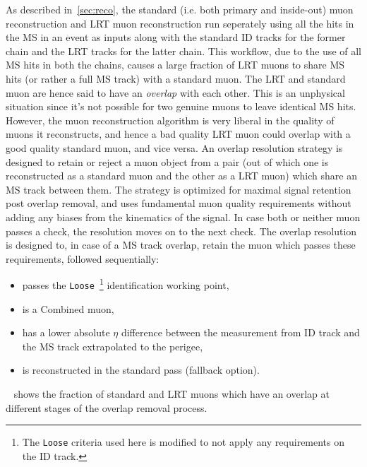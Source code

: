 As described in~\cref{sec:reco}, the standard (i.e. both primary and inside-out) muon reconstruction and LRT muon reconstruction run seperately using all the hits in the MS in an event as inputs along with the standard ID tracks for the former chain and the LRT tracks for the latter chain. This workflow, due to the use of all MS hits in both the chains, causes a large fraction of LRT muons to share MS hits (or rather a full MS track) with a standard muon. The LRT and standard muon are hence said to have an \textit{overlap} with each other. This is an unphysical situation since it's not possible for two genuine muons to leave identical MS hits. However, the muon reconstruction algorithm is very liberal in the quality of muons it reconstructs, and hence a bad quality LRT muon could overlap with a good quality standard muon, and vice versa. An overlap resolution strategy is designed to retain or reject a muon object from a pair (out of which one is reconstructed as a standard muon and the other as a LRT muon) which share an MS track between them. The strategy is optimized for maximal signal retention post overlap removal, and uses fundamental muon quality requirements without adding any biases from the kinematics of the signal. In case both or neither muon passes a check, the resolution moves on to the next check. The overlap resolution is designed to, in case of a MS track overlap, retain the muon which passes these requirements, followed sequentially:
\begin{itemize}
    \item passes the \texttt{Loose}~\cite{MUON-2018-03}\footnote{The \texttt{Loose} criteria used here is modified to not apply any requirements on the ID track.} identification working point,
    \item is a Combined muon,
    \item has a lower absolute $\eta$ difference between the measurement from ID track and the MS track extrapolated to the perigee,
    \item is reconstructed in the standard pass (fallback option).
\end{itemize}
~ shows the fraction of standard and LRT muons which have an overlap at different stages of the overlap removal process.

